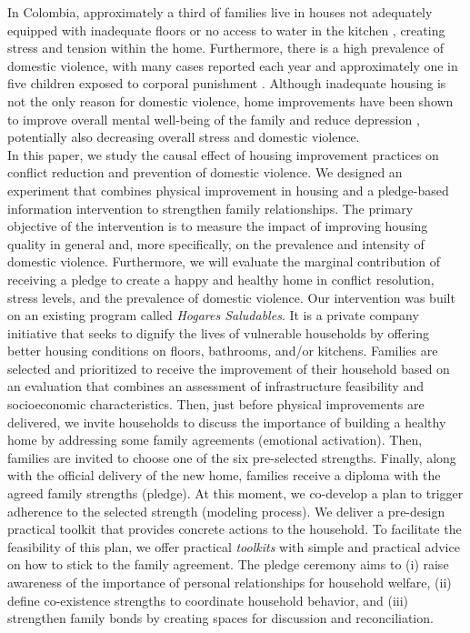         In Colombia, approximately a third of families live in houses not adequately equipped with inadequate floors or no access to water in the kitchen \cite{ECV_2021}, creating stress and tension within the home. Furthermore, there is a high prevalence of domestic violence, with many cases reported each year and approximately one in five children exposed to corporal punishment \cite{cuartas2019civil}. Although inadequate housing is not the only reason for domestic violence, home improvements have been shown to improve overall mental well-being of the family \cite{curl2015physical,devoto2012happiness} and reduce depression \cite{cattaneo2009housing}, potentially also decreasing overall stress and domestic violence. \\

        In this paper, we study the causal effect of housing improvement practices on conflict reduction and prevention of domestic violence. We designed an experiment that combines physical improvement in housing and a pledge-based information intervention to strengthen family relationships. The primary objective of the intervention is to measure the impact of improving housing quality in general and, more specifically, on the prevalence and intensity of domestic violence. Furthermore, we will evaluate the marginal contribution of receiving a pledge to create a happy and healthy home in conflict resolution, stress levels, and the prevalence of domestic violence. Our intervention was built on an existing program called \emph{Hogares Saludables}. It is a private company initiative that seeks to dignify the lives of vulnerable households by offering better housing conditions on floors, bathrooms, and/or kitchens. Families are selected and prioritized to receive the improvement of their household based on an evaluation that combines an assessment of infrastructure feasibility and socioeconomic characteristics. Then, just before physical improvements are delivered, we invite households to discuss the importance of building a healthy home by addressing some family agreements (emotional activation). Then, families are invited to choose one of the six pre-selected strengths. Finally, along with the official delivery of the new home, families receive a diploma with the agreed family strengths (pledge). At this moment, we co-develop a plan to trigger adherence to the selected strength (modeling process). We deliver a pre-design practical toolkit that provides concrete actions to the household. To facilitate the feasibility of this plan, we offer practical \emph{toolkits} with simple and practical advice on how to stick to the family agreement. The pledge ceremony aims to (i) raise awareness of the importance of personal relationships for household welfare, (ii) define co-existence strengths to coordinate household behavior, and (iii) strengthen family bonds by creating spaces for discussion and reconciliation. 

